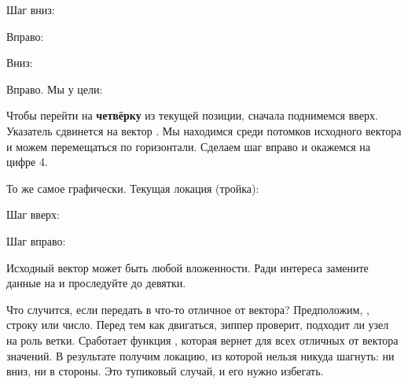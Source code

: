 Шаг вниз:

\begin{figure}[H]
  \centering
  
  \label{fig:chart-zip-05}
\end{figure}

\pagebreaklarge

Вправо:

\begin{figure}[H]
  \centering
  
  \label{fig:chart-zip-06}
\end{figure}

Вниз:

\begin{figure}[H]
  \centering
  
  \label{fig:chart-zip-07}
\end{figure}

Вправо. Мы у цели:

\begin{figure}[H]
  \centering
  
  \label{fig:chart-zip-08}
\end{figure}

Чтобы перейти на \textbf{четвёрку} из текущей позиции, сначала поднимемся
вверх. Указатель сдвинется на вектор \code{[2 3]}. Мы находимся среди потомков
исходного вектора и можем перемещаться по горизонтали. Сделаем шаг вправо и
окажемся на цифре 4.

\pagebreaklarge

То же самое графически. Текущая локация (тройка):

\begin{figure}[H]
  \centering
  
  \label{fig:chart-zip-09}
\end{figure}

Шаг вверх:

\begin{figure}[H]
  \centering
  
  \label{fig:chart-zip-10}
\end{figure}

Шаг вправо:

\begin{figure}[H]
  \centering
  
  \label{fig:chart-zip-11}
\end{figure}

Исходный вектор может быть любой вложенности. Ради интереса замените данные на
 и проследуйте до девятки.

Что случится, если передать в  что-то отличное от вектора?
Предположим, , строку или число. Перед тем как двигаться, зиппер проверит,
подходит ли узел на роль ветки. Сработает функция , которая вернет
 для всех отличных от вектора значений. В результате получим локацию, из
которой нельзя никуда шагнуть: ни вниз, ни в стороны. Это тупиковый случай, и
его нужно избегать.


